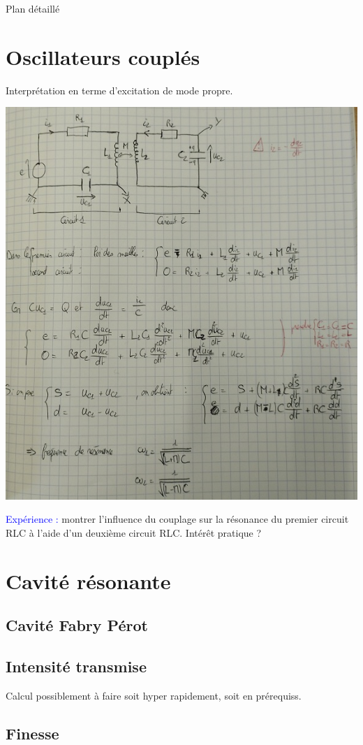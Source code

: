 \begin{reportBlock}{Plan détaillé}
\section{Oscillateurs couplés}
Interprétation en terme d'excitation de mode propre.
\begin{center}
    \includegraphics[scale=0.5]{LP_Resonance/Oscillateurs_couple.jpg}
\end{center}    


\textcolor{blue}{Expérience : }montrer l'influence du couplage sur la résonance du premier circuit RLC à l'aide d'un deuxième circuit RLC. Intérêt pratique ?

\section{Cavité résonante}
\subsection{Cavité Fabry Pérot}
\subsection{Intensité transmise}
Calcul possiblement à faire soit hyper rapidement, soit en prérequiss.

\subsection{Finesse}
\end{reportBlock}